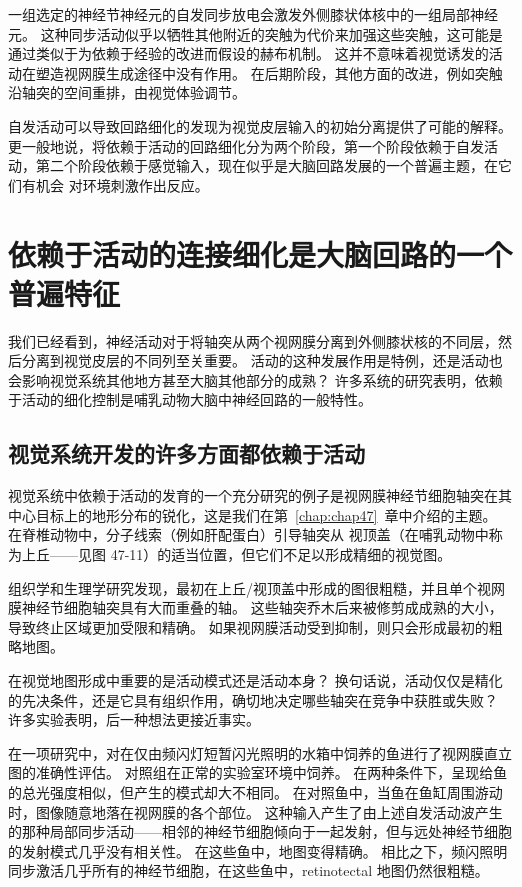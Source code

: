 一组选定的神经节神经元的自发同步放电会激发外侧膝状体核中的一组局部神经元。
这种同步活动似乎以牺牲其他附近的突触为代价来加强这些突触，这可能是通过类似于为依赖于经验的改进而假设的赫布机制。
这并不意味着视觉诱发的活动在塑造视网膜生成途径中没有作用。
在后期阶段，其他方面的改进，例如突触沿轴突的空间重排，由视觉体验调节。


自发活动可以导致回路细化的发现为视觉皮层输入的初始分离提供了可能的解释。
更一般地说，将依赖于活动的回路细化分为两个阶段，第一个阶段依赖于自发活动，第二个阶段依赖于感觉输入，现在似乎是大脑回路发展的一个普遍主题，在它们有机会 对环境刺激作出反应。



\section{依赖于活动的连接细化是大脑回路的一个普遍特征}

我们已经看到，神经活动对于将轴突从两个视网膜分离到外侧膝状核的不同层，然后分离到视觉皮层的不同列至关重要。
活动的这种发展作用是特例，还是活动也会影响视觉系统其他地方甚至大脑其他部分的成熟？
许多系统的研究表明，依赖于活动的细化控制是哺乳动物大脑中神经回路的一般特性。



\subsection{视觉系统开发的许多方面都依赖于活动}

视觉系统中依赖于活动的发育的一个充分研究的例子是视网膜神经节细胞轴突在其中心目标上的地形分布的锐化，这是我们在第~\ref{chap:chap47}~章中介绍的主题。
在脊椎动物中，分子线索（例如肝配蛋白）引导轴突从 视顶盖（在哺乳动物中称为上丘——见图 47-11）的适当位置，但它们不足以形成精细的视觉图。


组织学和生理学研究发现，最初在上丘/视顶盖中形成的图很粗糙，并且单个视网膜神经节细胞轴突具有大而重叠的轴。
这些轴突乔木后来被修剪成成熟的大小，导致终止区域更加受限和精确。
如果视网膜活动受到抑制，则只会形成最初的粗略地图。


在视觉地图形成中重要的是活动模式还是活动本身？
换句话说，活动仅仅是精化的先决条件，还是它具有组织作用，确切地决定哪些轴突在竞争中获胜或失败？
许多实验表明，后一种想法更接近事实。


在一项研究中，对在仅由频闪灯短暂闪光照明的水箱中饲养的鱼进行了视网膜直立图的准确性评估。
对照组在正常的实验室环境中饲养。
在两种条件下，呈现给鱼的总光强度相似，但产生的模式却大不相同。
在对照鱼中，当鱼在鱼缸周围游动时，图像随意地落在视网膜的各个部位。
这种输入产生了由上述自发活动波产生的那种局部同步活动——相邻的神经节细胞倾向于一起发射，但与远处神经节细胞的发射模式几乎没有相关性。
在这些鱼中，地图变得精确。
相比之下，频闪照明同步激活几乎所有的神经节细胞，在这些鱼中，retinotectal 地图仍然很粗糙。



